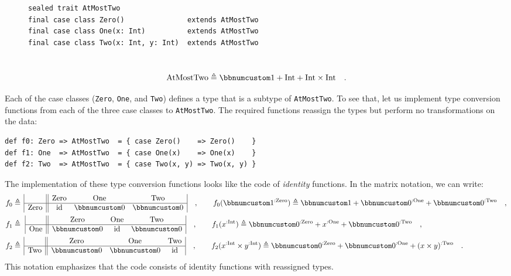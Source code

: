\begin{wrapfigure}{l}{0.57\columnwidth}%
\vspace{-0.8\baselineskip}

\begin{lstlisting}
sealed trait AtMostTwo
final case class Zero()               extends AtMostTwo
final case class One(x: Int)          extends AtMostTwo
final case class Two(x: Int, y: Int)  extends AtMostTwo
\end{lstlisting}

\vspace{-0.8\baselineskip}
\end{wrapfigure}%

~\vspace{-0.6\baselineskip}
\[
\text{AtMostTwo}\triangleq\bbnum 1+\text{Int}+\text{Int}\times\text{Int}\quad.
\]

Each of the case classes (\lstinline!Zero!, \lstinline!One!, and
\lstinline!Two!) defines a type that is a subtype of \lstinline!AtMostTwo!.
To see that, let us implement type conversion functions from each
of the three case classes to \lstinline!AtMostTwo!. The required
functions reassign the types but perform no transformations on the
data:
\begin{lstlisting}
def f0: Zero => AtMostTwo  = { case Zero()    => Zero()    }
def f1: One  => AtMostTwo  = { case One(x)    => One(x)    }
def f2: Two  => AtMostTwo  = { case Two(x, y) => Two(x, y) }
\end{lstlisting}
The implementation of these type conversion functions looks like the
code of \emph{identity} functions. In the matrix notation, we can
write:
\begin{align*}
f_{0} & \triangleq\,\begin{array}{|c||ccc|}
 & \text{Zero} & \text{One} & \text{Two}\\
\hline \text{Zero} & \text{id} & \bbnum 0 & \bbnum 0
\end{array}\quad,\quad\quad f_{0}(\bbnum 1^{:\text{Zero}})\triangleq\bbnum 1+\bbnum 0^{:\text{One}}+\bbnum 0^{:\text{Two}}\quad,\\
f_{1} & \triangleq\,\,\begin{array}{|c||ccc|}
 & \text{Zero} & \text{One} & \text{Two}\\
\hline \text{One} & \bbnum 0 & \text{id} & \bbnum 0
\end{array}\quad,\quad\quad f_{1}(x^{:\text{Int}})\triangleq\bbnum 0^{:\text{Zero}}+x^{:\text{One}}+\bbnum 0^{:\text{Two}}\quad,\\
f_{2} & \triangleq\,\begin{array}{|c||ccc|}
 & \text{Zero} & \text{One} & \text{Two}\\
\hline \text{Two} & \bbnum 0 & \bbnum 0 & \text{id}
\end{array}\quad,\quad\quad f_{2}(x^{:\text{Int}}\times y^{:\text{Int}})\triangleq\bbnum 0^{:\text{Zero}}+\bbnum 0^{:\text{One}}+(x\times y)^{:\text{Two}}\quad.
\end{align*}
This notation emphasizes that the code consists of identity functions
with reassigned types.

